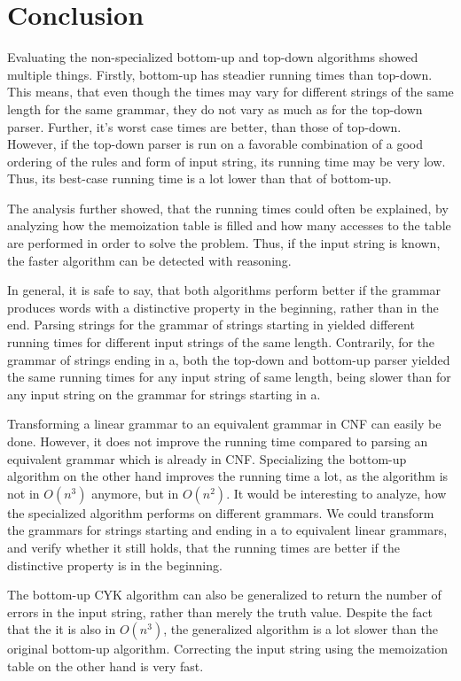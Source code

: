 \newpage
\section{Conclusion}

Evaluating the non-specialized bottom-up and top-down algorithms showed multiple things.
Firstly, bottom-up has steadier running times than top-down.
This means, that even though the times may vary for different strings of the same length for the same grammar, they do not vary as much as for the top-down parser.
Further, it's worst case times are better, than those of top-down.
However, if the top-down parser is run on a favorable combination of a good ordering of the rules and form of input string, its running time may be very low.
Thus, its best-case running time is a lot lower than that of bottom-up.

The analysis further showed, that the running times could often be explained, by analyzing how the memoization table is filled and how many accesses to the table are performed in order to solve the problem.
Thus, if the input string is known, the faster algorithm can be detected with reasoning.

In general, it is safe to say, that both algorithms perform better if the grammar produces words with a distinctive property in the beginning, rather than in the end.
Parsing strings for the grammar of strings starting in yielded different running times for different input strings of the same length.
Contrarily, for the grammar of strings ending in a, both the top-down and bottom-up parser yielded the same running times for any input string of same length, being slower than for any input string on the grammar for strings starting in a.

Transforming a linear grammar to an equivalent grammar in CNF can easily be done.
However, it does not improve the running time compared to parsing an equivalent grammar which is already in CNF.
Specializing the bottom-up algorithm on the other hand improves the running time a lot, as the algorithm is not in $O(n^3)$ anymore, but in $O(n^2)$.
It would be interesting to analyze, how the specialized algorithm performs on different grammars.
We could transform the grammars for strings starting and ending in a to equivalent linear grammars, and verify whether it still holds, that the running times are better if the distinctive property is in the beginning.

The bottom-up CYK algorithm can also be generalized to return the number of errors in the input string, rather than merely the truth value.
Despite the fact that the it is also in $O(n^3)$, the generalized algorithm is a lot slower than the original bottom-up algorithm.
Correcting the input string using the memoization table on the other hand is very fast.
